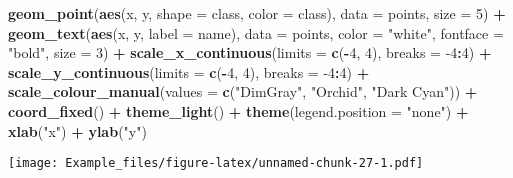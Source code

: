 \documentclass[]{article}
\newenvironment{Shaded}{\begin{snugshade}}{\end{snugshade}}
\newcommand{\DataTypeTok}[1]{\textcolor[rgb]{0.13,0.29,0.53}{#1}}
\newcommand{\DecValTok}[1]{\textcolor[rgb]{0.00,0.00,0.81}{#1}}
\newcommand{\KeywordTok}[1]{\textcolor[rgb]{0.13,0.29,0.53}{\textbf{#1}}}
\newcommand{\NormalTok}[1]{#1}
\newcommand{\OperatorTok}[1]{\textcolor[rgb]{0.81,0.36,0.00}{\textbf{#1}}}
\newcommand{\StringTok}[1]{\textcolor[rgb]{0.31,0.60,0.02}{#1}}
\begin{document}
\begin{Shaded}
\begin{Highlighting}[]
\StringTok{  }\KeywordTok{geom_point}\NormalTok{(}\KeywordTok{aes}\NormalTok{(x, y, }\DataTypeTok{shape =}\NormalTok{ class, }\DataTypeTok{color =}\NormalTok{ class), }\DataTypeTok{data =}\NormalTok{ points, }\DataTypeTok{size =} \DecValTok{5}\NormalTok{) }\OperatorTok{+}
\StringTok{  }\KeywordTok{geom_text}\NormalTok{(}\KeywordTok{aes}\NormalTok{(x, y, }\DataTypeTok{label =}\NormalTok{ name), }\DataTypeTok{data =}\NormalTok{ points, }\DataTypeTok{color =} \StringTok{"white"}\NormalTok{, }\DataTypeTok{fontface =} \StringTok{"bold"}\NormalTok{, }\DataTypeTok{size =} \DecValTok{3}\NormalTok{) }\OperatorTok{+}
\StringTok{  }
\StringTok{   }\KeywordTok{scale_x_continuous}\NormalTok{(}\DataTypeTok{limits =} \KeywordTok{c}\NormalTok{(}\OperatorTok{-}\DecValTok{4}\NormalTok{, }\DecValTok{4}\NormalTok{), }\DataTypeTok{breaks =} \DecValTok{-4}\OperatorTok{:}\DecValTok{4}\NormalTok{) }\OperatorTok{+}
\StringTok{  }\KeywordTok{scale_y_continuous}\NormalTok{(}\DataTypeTok{limits =} \KeywordTok{c}\NormalTok{(}\OperatorTok{-}\DecValTok{4}\NormalTok{, }\DecValTok{4}\NormalTok{), }\DataTypeTok{breaks =} \DecValTok{-4}\OperatorTok{:}\DecValTok{4}\NormalTok{) }\OperatorTok{+}
\StringTok{  }\KeywordTok{scale_colour_manual}\NormalTok{(}\DataTypeTok{values =} \KeywordTok{c}\NormalTok{(}\StringTok{"DimGray"}\NormalTok{, }\StringTok{"Orchid"}\NormalTok{, }\StringTok{"Dark Cyan"}\NormalTok{)) }\OperatorTok{+}
\StringTok{  }\KeywordTok{coord_fixed}\NormalTok{() }\OperatorTok{+}
\StringTok{  }
\StringTok{  }\KeywordTok{theme_light}\NormalTok{() }\OperatorTok{+}
\StringTok{  }\KeywordTok{theme}\NormalTok{(}\DataTypeTok{legend.position =} \StringTok{"none"}\NormalTok{) }\OperatorTok{+}
\StringTok{  }\KeywordTok{xlab}\NormalTok{(}\StringTok{"x"}\NormalTok{) }\OperatorTok{+}
\StringTok{  }\KeywordTok{ylab}\NormalTok{(}\StringTok{"y"}\NormalTok{)}
\end{Highlighting}
\end{Shaded}

\texttt{[image: Example\_files/figure-latex/unnamed-chunk-27-1.pdf]}
\end{document}
